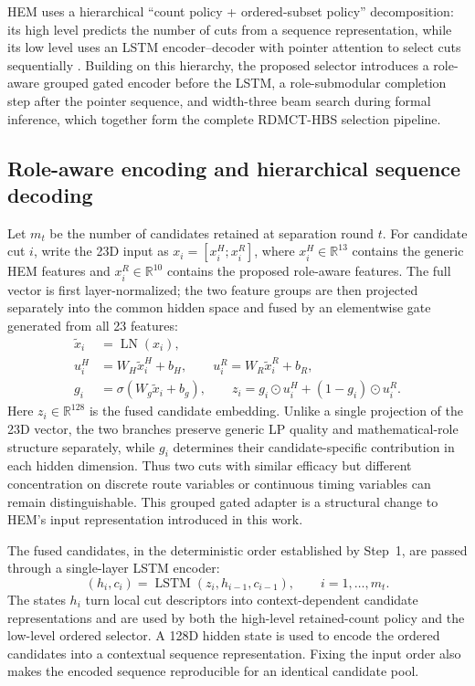 \documentclass[journal]{IEEEtran}
\begin{document}
HEM uses a hierarchical ``count policy + ordered-subset policy'' decomposition: its high level predicts the number of cuts from a sequence representation, while its low level uses an LSTM encoder--decoder with pointer attention to select cuts sequentially \cite{wang2023hem,vinyals2015pointer}. Building on this hierarchy, the proposed selector introduces a role-aware grouped gated encoder before the LSTM, a role-submodular completion step after the pointer sequence, and width-three beam search during formal inference, which together form the complete RDMCT-HBS selection pipeline.


\subsection{Role-aware encoding and hierarchical sequence decoding}

Let $m_t$ be the number of candidates retained at separation round $t$. For candidate cut $i$, write the 23D input as $x_i=[x_i^{H};x_i^{R}]$, where $x_i^{H}\in\mathbb R^{13}$ contains the generic HEM features and $x_i^{R}\in\mathbb R^{10}$ contains the proposed role-aware features. The full vector is first layer-normalized; the two feature groups are then projected separately into the common hidden space and fused by an elementwise gate generated from all 23 features:
\begin{equation}
\begin{aligned}
\widetilde x_i&=\operatorname{LN}(x_i),\\
u_i^{H}&=W_H\widetilde x_i^{H}+b_H,\qquad
u_i^{R}=W_R\widetilde x_i^{R}+b_R,\\
g_i&=\sigma(W_g\widetilde x_i+b_g),\qquad
z_i=g_i\odot u_i^{H}+(1-g_i)\odot u_i^{R}.
\end{aligned}
\label{eq:gated-encoding-en}
\end{equation}
Here $z_i\in\mathbb R^{128}$ is the fused candidate embedding. Unlike a single projection of the 23D vector, the two branches preserve generic LP quality and mathematical-role structure separately, while $g_i$ determines their candidate-specific contribution in each hidden dimension. Thus two cuts with similar efficacy but different concentration on discrete route variables or continuous timing variables can remain distinguishable. This grouped gated adapter is a structural change to HEM's input representation introduced in this work.

The fused candidates, in the deterministic order established by Step~1, are passed through a single-layer LSTM encoder:
\begin{equation}
(h_i,c_i)=\operatorname{LSTM}(z_i,h_{i-1},c_{i-1}),\qquad i=1,\ldots,m_t .
\label{eq:lstm-encoding-en}
\end{equation}
The states $h_i$ turn local cut descriptors into context-dependent candidate representations and are used by both the high-level retained-count policy and the low-level ordered selector. A 128D hidden state is used to encode the ordered candidates into a contextual sequence representation. Fixing the input order also makes the encoded sequence reproducible for an identical candidate pool.
\end{document}
